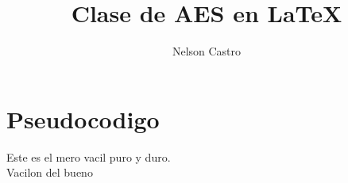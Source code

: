 \documentclass[12pt]{report}
\title{Clase de AES en \LaTeX}
\author{Nelson Castro}
\begin{document}
        \maketitle
        \newpage
        \section{Pseudocodigo}
        Este es el mero vacil puro y duro.\\
        Vacilon del bueno
    
\end{document}

